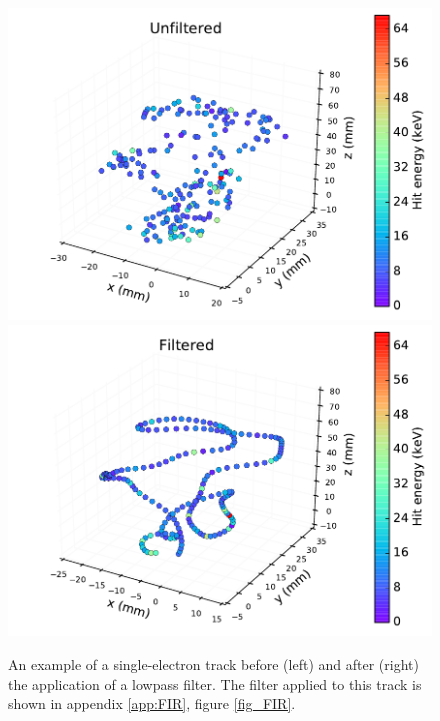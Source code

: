 \documentclass{JINST}
\begin{document}
\begin{figure}[!htb]
	\centering
	\includegraphics[scale=0.48]{fig/plt_trk_unflt_nmagse2_6.pdf}
	\includegraphics[scale=0.48]{fig/plt_trk_flt_nmagse2_6.pdf}
	\caption{\label{fig_flt}An example of a single-electron track before (left) and after (right) the application of a lowpass filter.  The filter applied to this track is shown in appendix \protect\ref{app:FIR}, figure \protect\ref{fig_FIR}.}
\end{figure}
\end{document}
